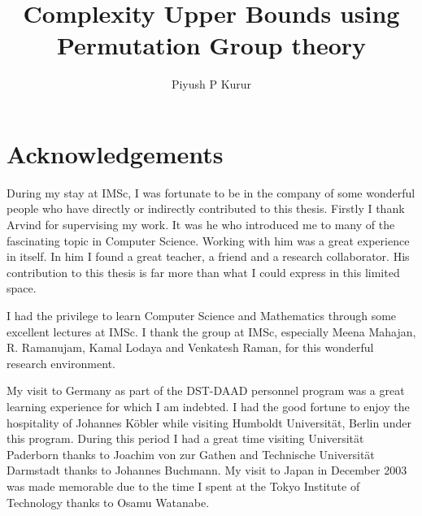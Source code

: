 \documentclass[11pt]{madras}%
\title{Complexity Upper Bounds using Permutation Group theory}
\author{Piyush P Kurur}
\theoremstyle{remark}
\begin{document}
\maketitle

\makedeclaration
\makecertificate 

%

\chapter*{Acknowledgements}

During my stay at IMSc, I was fortunate to be in the company of some
wonderful people who have directly or indirectly contributed to this
thesis. Firstly I thank Arvind for supervising my work. It was he who
introduced me to many of the fascinating topic in Computer Science.
Working with him was a great experience in itself. In him I found a
great teacher, a friend and a research collaborator. His contribution
to this thesis is far more than what I could express in this limited
space.

I had the privilege to learn Computer Science and Mathematics through
some excellent lectures at IMSc. I thank the group at IMSc, especially
Meena Mahajan, R. Ramanujam, Kamal Lodaya and Venkatesh Raman, for
this wonderful research environment.


My visit to Germany as part of the DST-DAAD personnel program was a
great learning experience for which I am indebted. I had the good
fortune to enjoy the hospitality of Johannes K\"obler while visiting
Humboldt Universit\"at, Berlin under this program.  During this period
I had a great time visiting Universit\"at Paderborn thanks to Joachim
von zur Gathen and Technische Universit\"at Darmstadt thanks to
Johannes Buchmann.  My visit to Japan in December 2003 was made
memorable due to the time I spent at the Tokyo Institute of Technology
thanks to Osamu Watanabe.

\end{document}
